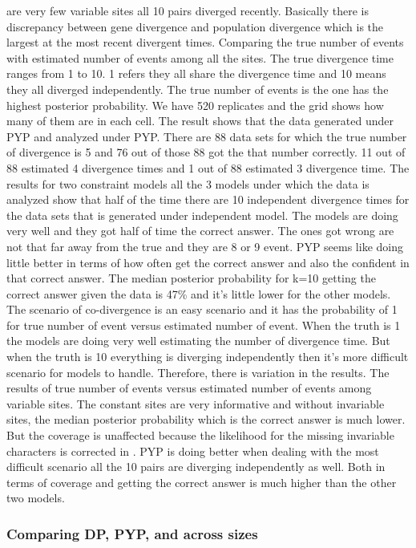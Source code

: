 \documentclass[letterpaper,12pt]{article}
\begin{document}
are very few variable sites all 10 pairs diverged recently. Basically there is discrepancy between 
gene divergence and population divergence which is the largest at the most recent divergent times.
Comparing the true number of events with estimated number of events among all the sites. The true 
divergence time ranges from 1 to 10.  1 refers they all share the divergence time and 10 means they all 
diverged independently. The true number of events is the one has the highest posterior probability.
We have 520 replicates and the grid shows how many of them are in each cell. The result shows 
that the data generated under PYP and analyzed under PYP. There are 88 data sets for which the true 
number of divergence is 5 and 76 out of those 88 got the that number correctly. 11 out of 88 
estimated 4 divergence times and 1 out of 88 estimated 3 divergence time. 
The results for two constraint models all the 3 models under which the data is analyzed show that 
half of the time there are 10 independent divergence times for the data sets that is generated under 
independent model. The models are doing very well and they got half of time the correct answer. The 
ones got wrong are not that far away from the true and they are 8 or 9 event. PYP seems like 
doing little better in terms of how often get the correct answer and also the confident in that 
correct answer. The median posterior probability for k=10 getting the correct answer
given the data is 47\% and it's little lower for the other models. The scenario of co-divergence
is an easy scenario and it has the probability of 1 for true number of event versus estimated number of 
event. When the truth is 1 the models are doing very well estimating the number of divergence time. But 
when the truth is 10 everything is diverging independently then it's more difficult scenario for 
models to handle. Therefore, there is variation in the results. 
The results of true number of events versus estimated number of events among variable sites. The
constant sites are very informative and without invariable sites, the median posterior probability
which is the correct answer is much lower. But the coverage is unaffected because the 
likelihood for the missing invariable characters is corrected in \ecoevolity. PYP is doing better when 
dealing with the most difficult scenario all the 10 pairs are diverging independently as well. Both in
terms of coverage and getting the correct answer is much higher than the other two models. 

\subsubsection{Comparing DP, PYP, and \wunif across \dataset sizes}
\end{document}
